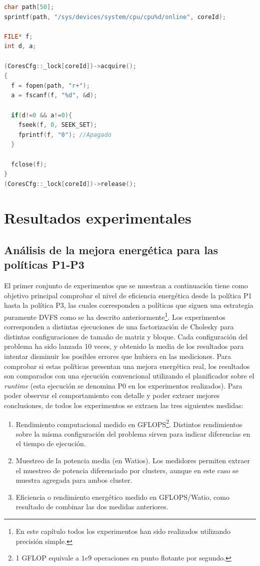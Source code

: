 \begin{lstlisting}[float,language=C++,caption={Fragmento de código para el apagado de núcleos de manera
    dinámica.},label={fig:lst:apagado-cores}]
char path[50];
sprintf(path, "/sys/devices/system/cpu/cpu%d/online", coreId);

FILE* f;
int d, a;

(CoresCfg::_lock[coreId])->acquire();
{
  f = fopen(path, "r+");
  a = fscanf(f, "%d", &d);
	
  if(d!=0 && a!=0){
    fseek(f, 0, SEEK_SET);
    fprintf(f, "0"); //Apagado
  }
	
  fclose(f);
}
(CoresCfg::_lock[coreId])->release();
\end{lstlisting}




\section{Resultados experimentales}

\subsection{Análisis de la mejora energética para las políticas P1-P3}
El primer conjunto de experimentos que se muestran a continuación tiene
como objetivo principal comprobar el nivel de eficiencia energética desde
la política P1 hasta la política P3, las cuales corresponden a políticas
que siguen una estrategia puramente DVFS como se ha descrito
anteriormente\footnote{En este capítulo todos los experimentos han sido
  realizados utilizando precisión simple.}. Los experimentos corresponden a
distintas ejecuciones de una factorización de Cholesky para distintas
configuraciones de tamaño de matriz y bloque. Cada configuración del
problema ha sido lanzada 10 veces, y obtenido la media de los resultados
para intentar disminuir los posibles errores que hubiera en las
mediciones. Para comprobar si estas políticas presentan una mejora
energética real, los resultados son comparados con una ejecución
convencional utilizando el planificador \botlev sobre el \emph{runtime}
\ompss (esta ejecución se denomina P0 en los experimentos realizados). Para
poder observar el comportamiento con detalle y poder extraer mejores
conclusiones, de todos los experimentos se extraen las tres siguientes
medidas:
\begin{enumerate}
\item Rendimiento computacional medido en GFLOPS\footnote{1 GFLOP equivale
    a $1e9$ operaciones en punto flotante por segundo.}. Distintos
  rendimientos sobre la misma configuración del problema sirven para
  indicar diferencias en el tiempo de ejecución.

\item Muestreo de la potencia media (en Watios). Los medidores permiten
  extraer el muestreo de potencia diferenciado por clusters, aunque en este
  caso se muestra agregada para ambos cluster.

\item Eficiencia o rendimiento energético medido en GFLOPS/Watio, como
  resultado de combinar las dos medidas anteriores.
\end{enumerate}

